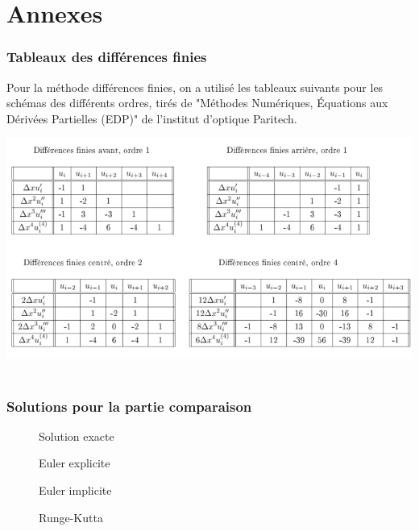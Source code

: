 \part*{Annexes}


\appendix
\section{Tableaux des différences finies}
Pour la méthode  différences finies, on a utilisé les tableaux suivants pour les schémas des différents ordres, tirés de "Méthodes Numériques, Équations aux Dérivées Partielles (EDP)" de l'institut d'optique Paritech.

\includegraphics[width=1\textwidth]{./annex1}~\\[1cm]

\section{Solutions pour la partie comparaison}
\begin{figure}[H]
\begin{minipage}[b]{.46\linewidth}
\centering{}
\caption{Solution exacte
    \label{fig1}
    }
\end{minipage} \hfill
\begin{minipage}[b]{.46\linewidth}
\centering{}
\caption{Euler explicite\label{fig2}}
\end{minipage}
\end{figure}

\begin{figure}[H]
\begin{minipage}[b]{.46\linewidth}
\centering{}
\caption{Euler implicite\label{fig1}}
\end{minipage} \hfill
\begin{minipage}[b]{.46\linewidth}
\centering{}
\caption{Runge-Kutta \label{fig2}}
\end{minipage}
\end{figure}